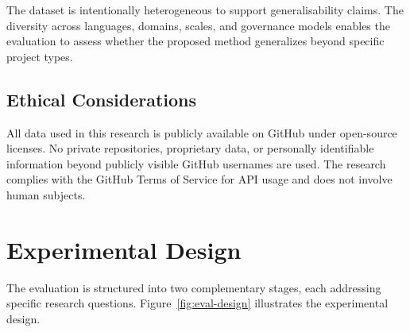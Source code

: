 The dataset is intentionally heterogeneous to support generalisability
claims. The diversity across languages, domains, scales, and governance
models enables the evaluation to assess whether the proposed method 
generalizes beyond specific project types.


\subsection{Ethical Considerations}
\label{sec:ethics}

All data used in this research is publicly available on GitHub under 
open-source licenses. No private repositories, proprietary data, or 
personally identifiable information beyond publicly visible GitHub 
usernames are used. The research complies with the GitHub Terms of Service 
for API usage and does not involve human subjects.


\section{Experimental Design}
\label{sec:eval-design}

The evaluation is structured into two complementary stages, each 
addressing specific research questions. Figure~\ref{fig:eval-design} 
illustrates the experimental design.

